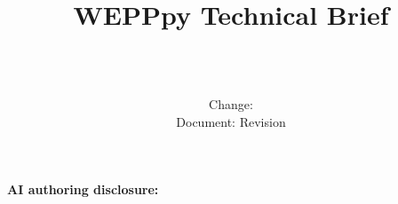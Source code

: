 \documentclass[11pt,letterpaper]{article}
\title{WEPPpy Technical Brief\\[0.3em]\large \BriefTitle}
\author{\ReportAuthors\\\small \ReportAffiliation\\
\small \href{mailto:\ReportContact}{\ReportContact}}
\date{Change: \ChangeDate\\Document: \DocumentDate\quad Revision \DocumentRevision}
\begin{document}
\maketitle
\thispagestyle{fancy}
\textbf{\DocumentStatus}

{\small \textbf{AI authoring disclosure:} \AIDisclosure\par}


\end{document}
